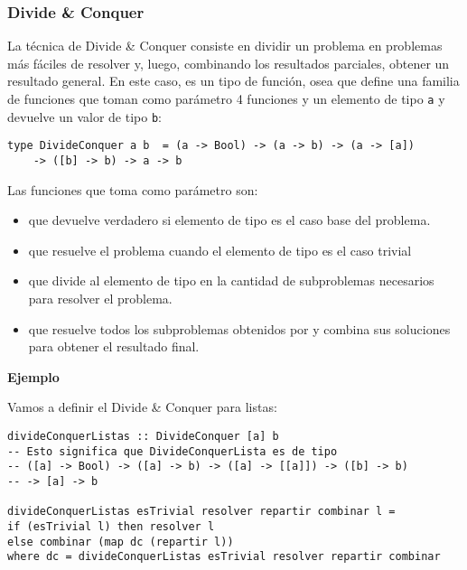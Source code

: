 \subsubsection{Divide \& Conquer}
La técnica de Divide \& Conquer consiste en dividir un problema en problemas más fáciles de resolver y, luego, combinando los resultados parciales, obtener un resultado general. En este caso,  es un tipo de función, osea que define una familia de funciones que toman como parámetro 4 funciones y un elemento de tipo \texttt{a} y devuelve un valor de tipo \texttt{b}:
\begin{centrado}
	\begin{verbatim}
type DivideConquer a b  = (a -> Bool) -> (a -> b) -> (a -> [a]) 
    -> ([b] -> b) -> a -> b                         
	\end{verbatim}
\end{centrado}
Las funciones que toma como parámetro son:
\begin{itemize}
	\item {} que devuelve verdadero si elemento de tipo  es el caso base del problema.
	\item {} que resuelve el problema cuando el elemento de tipo  es el caso trivial
	\item {} que divide al elemento de tipo  en la cantidad de subproblemas necesarios para resolver el problema.
	\item {} que resuelve todos los subproblemas obtenidos por  y combina sus soluciones para obtener el resultado final.
\end{itemize}

\textbf{Ejemplo}

Vamos a definir el Divide \& Conquer para listas:
\begin{centrado}
	\begin{verbatim}
divideConquerListas :: DivideConquer [a] b
-- Esto significa que DivideConquerLista es de tipo 
-- ([a] -> Bool) -> ([a] -> b) -> ([a] -> [[a]]) -> ([b] -> b)
-- -> [a] -> b
		
divideConquerListas esTrivial resolver repartir combinar l =
if (esTrivial l) then resolver l
else combinar (map dc (repartir l))
where dc = divideConquerListas esTrivial resolver repartir combinar	
	\end{verbatim}
\end{centrado}

